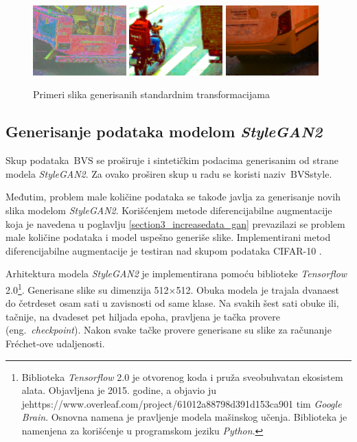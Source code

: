 \documentclass[12pt,oneside]{memoir}
\newcommand{\bvs}{\ensuremath{\,\textrm{BVS}}}
\begin{document}
\begin{figure}[!htbp]
  \includegraphics[width=0.32\textwidth]{matfmaster/glava4/basic_aug/7.jpg}
  \includegraphics[width=0.32\textwidth]{matfmaster/glava4/basic_aug/8.jpg}
  \includegraphics[width=0.32\textwidth]{matfmaster/glava4/basic_aug/9.jpg}
\caption{Primeri slika generisanih standardnim transformacijama}\label{fig:basic_aug}
\end{figure}

 
\subsection{Generisanje podataka modelom \textit{StyleGAN2}}

Skup podataka \bvs{} se proširuje i sintetičkim podacima generisanim od strane modela \textit{StyleGAN2}. Za ovako proširen skup u radu se koristi naziv \bvs{style}. 

Međutim, problem male količine podataka se takođe javlja za generisanje novih slika modelom \textit{StyleGAN2}. Korišćenjem metode diferencijabilne augmentacije koja je navedena u poglavlju \ref{section3_increasedata_gan} prevazilazi se problem male količine podataka i model uspešno generiše slike. Implementirani metod diferencijabilne augmentacije je testiran nad skupom podataka CIFAR-10 \cite{2020diffaugment_report}.

Arhitektura modela \textit{StyleGAN2} je implementirana pomoću biblioteke \textit{Tensorflow} 2.0\footnote{Biblioteka \textit{Tensorflow} 2.0 je otvorenog koda i pruža sveobuhvatan ekosistem alata. Objavljena je 2015. godine, a objavio ju jehttps://www.overleaf.com/project/61012a88798d391d153ca901 tim \textit{Google Brain}. Osnovna namena je pravljenje modela mašinskog učenja. Biblioteka je namenjena za korišćenje u programskom jeziku \textit{Python}.}.
Generisane slike su dimenzija 512\(\times\)512. Obuka modela je trajala dvanaest do četrdeset osam sati u zavisnosti od same klase. Na svakih šest sati obuke ili, tačnije, na dvadeset pet hiljada epoha, pravljena je tačka provere (eng.~\textit{checkpoint}). Nakon svake tačke provere generisane su slike za računanje Fréchet-ove udaljenosti.
\end{document}
